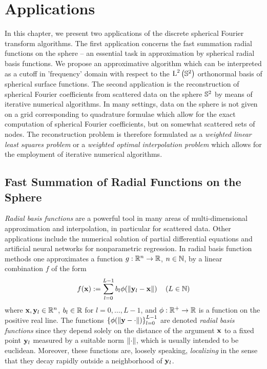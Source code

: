\chapter{Applications}
\label{Applications}

In this chapter, we present two applications of the discrete spherical Fourier transform algorithms. The first application concerns the fast summation radial
functions on the sphere -- an essential task in approximation by spherical
radial basis functions. We propose an approximative algorithm which can be
interpreted as a cutoff in 'frequency' domain with respect to the
$\text{\rm{L}}^{2}\left(\mathbb{S}^2\right)$ orthonormal basis of spherical surface functions.
The second application is the reconstruction of spherical Fourier coefficients
from scattered data on the sphere $\mathbb{S}^2$ by means of iterative 
numerical algorithms. In many settings, data on the sphere is not given on
a grid corresponding to quadrature formulae which allow for the exact
computation of spherical Fourier coefficients, but on somewhat scattered sets
of nodes. The reconstruction problem is therefore formulated as a
\emph{weighted linear least squares problem} or a 
\emph{weighted optimal interpolation problem} which allows for the 
employment of iterative numerical algorithms.

\section{Fast Summation of Radial Functions on the Sphere}
\label{Applications:FastSum}
\emph{Radial basis functions} are a powerful tool in many areas of multi-dimensional 
approximation and interpolation, in particular for scattered data. Other applications
include the numerical solution of partial differential equations and artificial neural networks 
for nonparametric regression.
In radial basis function methods one approximates a function $g: \mathbb{R}^n
\rightarrow \mathbb{R}$, $n \in \mathbb{N}$, by a linear combination $f$ of the form
\begin{equation}
  \nonumber
  f{\hspace{-0.4ex}}\left(\mathbf{x}\right) := \sum_{l=0}^{L-1} b_{l} \phi{\hspace{-0.4ex}}\left(\left\|\mathbf{y}_{l}-\mathbf{x}\right\|\right) \quad \left(L \in \mathbb{N}\right)
\end{equation}
where $\mathbf{x}, \mathbf{y}_{l} \in \mathbb{R}^n$, $b_{l} \in \mathbb{R}$ for $l = 0,\ldots,L-1$, and 
$\phi: \mathbb{R}^{+} \rightarrow \mathbb{R}$ is a function on the positive real line. 
The functions $\left\{\phi{\hspace{-0.4ex}}\left(\left\|\mathbf{y}-\cdot\right\|\right)\right\rbrace_{l=0}^{L-1}$ are
denoted \emph{radial basis functions} since they depend solely on 
the distance of the argument $\mathbf{x}$ to a fixed point $\mathbf{y}_{l}$ measured 
by a suitable norm $\left\|\cdot\right\|$, which is usually intended to be euclidean.
Moreover, these functions are, loosely speaking, \emph{localizing} in the sense 
that they decay rapidly outside a neighborhood of $\mathbf{y}_{l}$.

